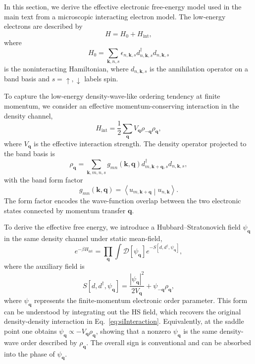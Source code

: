 \documentclass[aps,prx,article,twocolumn,amsmath,amssymb,superscriptaddress,longbibliography]{revtex4-2}
\begin{document}
In this section, we derive the effective electronic free-energy model
used in the main text from a microscopic interacting electron model.
The low-energy electrons are described by
\begin{equation}
H
=
H_0
+
H_{\mathrm{int}},
\end{equation}
where
\begin{equation}
H_0
=
\sum_{\mathbf k,n,s}
\epsilon_{n,\mathbf k,s}
d^\dagger_{n,\mathbf k,s}
d_{n,\mathbf k,s}
\end{equation}
is the noninteracting Hamiltonian, where $d_{n,\mathbf k,s}$ is the
annihilation operator on a band basis and $s=\uparrow,\downarrow$ labels
spin.

To capture the low-energy density-wave-like ordering tendency at finite
momentum, we consider an effective momentum-conserving interaction in
the density channel,
\begin{equation}
\label{eq:siInteraction}
H_{\mathrm{int}}
=
\frac12
\sum_{\mathbf q}
V_{\mathbf q}
\rho_{-\mathbf q}
\rho_{\mathbf q},
\end{equation}
where $V_{\mathbf q}$ is the effective interaction strength.
The density operator projected to the band basis is
\begin{equation}
\rho_{\mathbf q}
=
\sum_{\mathbf k,m,n,s}
g_{mn}(\mathbf k,\mathbf q)
d^\dagger_{m,\mathbf k+\mathbf q,s}
d_{n,\mathbf k,s},
\end{equation}
with the band form factor
\begin{equation}
g_{mn}(\mathbf k,\mathbf q)
=
\left\langle
u_{m,\mathbf k+\mathbf q}
\middle|
u_{n,\mathbf k}
\right\rangle .
\end{equation}
The form factor encodes the wave-function overlap between the two
electronic states connected by momentum transfer $\mathbf q$.

To derive the effective free energy, we introduce a Hubbard--Stratonovich
field $\psi_{\mathbf q}$ in the same density channel under static mean-field,
\begin{equation}
e^{-\beta H_{\mathrm{int}}}
=
\prod_{\mathbf q}
\int
\mathcal D[\psi_{\mathbf q}]
e^{-S[d,d^\dagger,\psi_{\mathbf q}]},
\end{equation}
where the auxiliary field is 
\begin{equation}
\label{eq:siHSField}
S[d,d^\dagger,\psi_{\mathbf q}]
=
\frac{
|\psi_{\mathbf q}|^2
}{
2V_{\mathbf q}
}
+
\psi_{-\mathbf q}\rho_{\mathbf q},
\end{equation}
where $\psi_{\mathbf q}$ represents the finite-momentum electronic order
parameter.  This form can be understood by integrating out the HS field,
which recovers the original density-density interaction in
Eq.~\eqref{eq:siInteraction}.  Equivalently, at the saddle point one
obtains $\psi_{\mathbf q}\propto -V_{\mathbf q}\rho_{\mathbf q}$,
showing that a nonzero $\psi_{\mathbf q}$ is the same density-wave order
described by $\rho_{\mathbf q}$.  The overall sign is conventional and
can be absorbed into the phase of $\psi_{\mathbf q}$.
\end{document}
